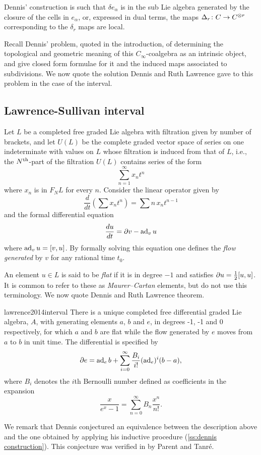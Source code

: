 Dennis' construction is such that $\delta e_\alpha$ is in the sub Lie algebra generated by the closure of the cells in $e_\alpha$, or, expressed in dual terms, the maps $\operatorname{\Delta}_r \colon C \to C^{\otimes r}$ corresponding to the $\delta_r$ maps are local.

Recall Dennis' problem, quoted in the introduction, of determining the topological and geometric meaning of this $C_\infty$-coalgebra as an intrinsic object, and give closed form formulae for it and the induced maps associated to subdivisions.
We now quote the solution Dennis and Ruth Lawrence gave to this problem in the case of the interval.

\subsection{Lawrence-Sullivan interval} \label{ss:LS interval}

Let $L$ be a completed free graded Lie algebra with filtration given by number of brackets, and let $U(L)$ be the complete graded vector space of series on one indeterminate with values on $L$ whose filtration is induced from that of $L$, i.e., the $N^{\mathrm{th}}$-part of the filtration $U(L)$ contains series of the form
\[
\sum_{n=1}^\infty x_n t^n
\]
where $x_n$ is in $F_N L$ for every $n$.
Consider the linear operator given by
\[
\frac{d}{dt} \left(\sum x_n t^n\right) = \sum n \, x_n t^{n-1}
\]
and the formal differential equation
\[
\frac{du}{dt} = \partial v - \operatorname{ad}_v u
\]
where $\operatorname{ad}_v u = [v, u]$.
By formally solving this equation one defines the \textit{flow generated} by $v$ for any rational time $t_0$.

An element $u \in L$ is said to be \textit{flat} if it is in degree $-1$ and satisfies $\partial u = \frac{1}{2} [u,u]$.
It is common to refer to these as \textit{Maurer--Cartan} elements, but do not use this terminology.
We now quote Dennis and Ruth Lawrence theorem.
\begin{displaycquote}[Theorem 1]{lawrence2014interval}
	There is a unique completed free differential graded Lie algebra, $A$, with generating elements $a$, $b$ and $e$, in degrees -1, -1 and 0 respectively, for which $a$ and $b$ are flat while the flow generated by $e$ moves from $a$ to $b$ in unit time.
	The differential is specified by
	\[
	\partial e = \operatorname{ad}_e b + \sum_{i=0}^{\infty} \frac{B_i}{i!}(\operatorname{ad}_e)^i(b-a),
	\]
	where $B_i$ denotes the $i$th Bernoulli number defined as coefficients in the expansion
	\[
	\frac{x}{e^x-1} = \sum_{n=0}^{\infty} B_n \frac{x^n}{n!}.
	\]
\end{displaycquote}
We remark that Dennis conjectured an equivalence between the description above and the one obtained by applying his inductive procedure (\cref{ss:dennis construction}).
This conjecture was verified in \cite{parent2012interval} by Parent and Tanr\'{e}.


